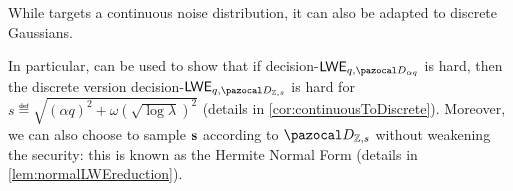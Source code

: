 While  targets a continuous noise distribution, it can also be adapted to discrete Gaussians.

In particular, \cite[Thm.~3.1]{Pei10_EfficientParallelGaussian} can be used to show that if decision-$\LWE_{q,\cD_{\alpha q}}$ is hard, then the discrete version decision-$\LWE_{q,\cD_{\Z, s}}$ is hard for $s \eqdef \sqrt{(\alpha q)^2 + \omega\left(\sqrt{\log \lambda}\right)^2}$ (details in \cref{cor:continuousToDiscrete}). Moreover, we can also choose to sample $\mathbf{s}$ according to $\cD_{\Z,s}$ without weakening the security: this is known as the Hermite Normal Form (details in \cref{lem:normalLWEreduction}).

